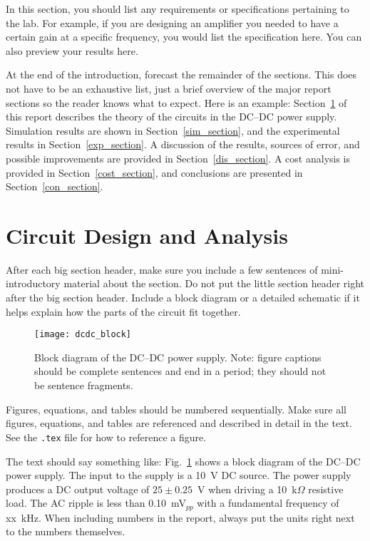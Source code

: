 \documentclass[11pt]{article}
\begin{document}
In this section, you should list any requirements or specifications pertaining to the lab. For example, if you are designing an amplifier you needed to have a certain gain at a specific frequency, you would list the specification here. You can also preview your results here. 

At the end of the introduction, forecast the remainder of the sections. This does not have to be an exhaustive list, just a brief overview of the major report sections so the reader knows what to expect. Here is an example:
Section~\ref{design_section} of this report describes the theory of the circuits in the DC--DC power supply. Simulation results are shown in Section~\ref{sim_section}, and the experimental results in Section~\ref{exp_section}. A discussion of the results, sources of error, and possible improvements are provided in Section~\ref{dis_section}. A cost analysis is provided in Section~\ref{cost_section}, and conclusions are presented in Section~\ref{con_section}.

\section{Circuit Design and Analysis}
\label{design_section}

After each big section header, make sure you include a few sentences of mini-introductory material about the section. Do not put the little section header right after the big section header. Include a block diagram or a detailed schematic if it helps explain how the parts of the circuit fit together.

\begin{figure}[ht]
\centering
\texttt{[image: dcdc\_block]}
\caption{Block diagram of the DC--DC power supply. Note: figure captions should be complete sentences and end in a period; they should not be sentence fragments.}
\label{block}
\end{figure}

Figures, equations, and tables should be numbered sequentially. Make sure all figures, equations, and tables are referenced and described in detail in the text. See the {\tt .tex} file for how to reference a figure. 

The text should say something like: Fig.~\ref{block} shows a block diagram of the DC--DC power supply. The input to the supply is a 10~V DC source. The power supply produces a DC output voltage of $25 \pm 0.25$~V when driving a 10~k$\Omega$ resistive load. The AC ripple is less than 0.10~mV$_{pp}$ with a fundamental frequency of xx~kHz. When including numbers in the report, always put the units right next to the numbers themselves.
\end{document}

